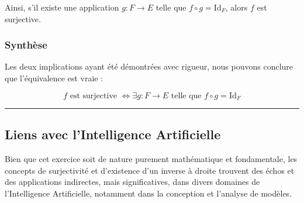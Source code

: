 \documentclass[12pt,a4paper]{report}
\begin{document}
Ainsi, s'il existe une application \(g: F \to E\) telle que
\(f \circ g = \text{Id}_F\), alors \(f\) est surjective.

\subsubsection{Synthèse}\label{synthuxe8se}

Les deux implications ayant été démontrées avec rigueur, nous pouvons
conclure que l'équivalence est vraie :

\[
f \text{ est surjective } \iff \exists g: F \to E \text{ telle que } f \circ g = \text{Id}_F
\]

\begin{center}\rule{0.5\linewidth}{0.5pt}\end{center}

\subsection{Liens avec l'Intelligence
Artificielle}\label{liens-avec-lintelligence-artificielle}

Bien que cet exercice soit de nature purement mathématique et
fondamentale, les concepts de surjectivité et d'existence d'un inverse à
droite trouvent des échos et des applications indirectes, mais
significatives, dans divers domaines de l'Intelligence Artificielle,
notamment dans la conception et l'analyse de modèles.
\end{document}
